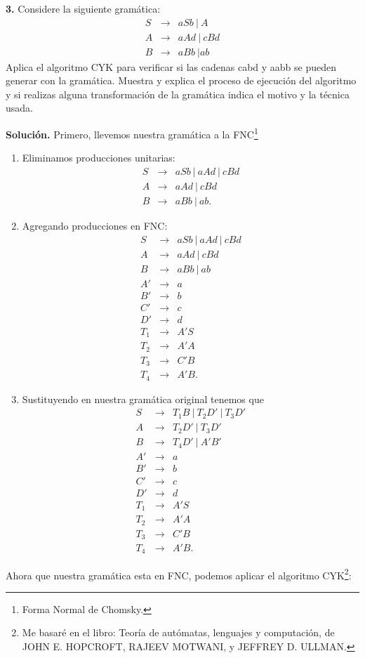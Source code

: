 \textbf{3.} Considere la siguiente gramática:
\begin{eqnarray*}
  S &\rightarrow& aSb\ |\ A\\
  A &\rightarrow& aAd\ |\ cBd\\
  B &\rightarrow& aBb\ | ab
\end{eqnarray*}
Aplica el algoritmo CYK para verificar si las cadenas cabd y aabb se pueden generar con la gramática.
Muestra y explica el proceso de ejecución del algoritmo y si realizas alguna transformación de la gramática
indica el motivo y la técnica usada. \newline

\textbf{Solución.} Primero, llevemos nuestra gramática a la FNC\footnote{Forma Normal de Chomsky.}
\begin{enumerate}
\item Eliminamos producciones unitarias:
\begin{eqnarray*}
S &\rightarrow& aSb\ |\ aAd\ |\ cBd\\
A &\rightarrow& aAd\ |\ cBd\\
B &\rightarrow& aBb\ |\ ab.
\end{eqnarray*}
\item Agregando producciones en FNC:
\begin{eqnarray*}
S &\rightarrow& aSb\ |\ aAd\ |\ cBd\\
A &\rightarrow& aAd\ |\ cBd\\
B &\rightarrow& aBb\ |\ ab\\
A' &\rightarrow& a\\
B' &\rightarrow& b\\
C' &\rightarrow& c\\
D' &\rightarrow& d\\
T_1 &\rightarrow& A'S\\
T_2 &\rightarrow& A'A\\
T_3 &\rightarrow& C'B\\
T_4 &\rightarrow& A'B.
\end{eqnarray*}
\item Sustituyendo en nuestra gramática original tenemos que
\begin{eqnarray*}
S &\rightarrow& T_1B\ |\ T_2D'\ |\ T_3D'\\
A &\rightarrow& T_2D'\ |\ T_3D'\\
B &\rightarrow& T_4D'\ |\ A'B'\\
A' &\rightarrow& a\\
B' &\rightarrow& b\\
C' &\rightarrow& c\\
D' &\rightarrow& d\\
T_1 &\rightarrow& A'S\\
T_2 &\rightarrow& A'A\\
T_3 &\rightarrow& C'B\\
T_4 &\rightarrow& A'B.
\end{eqnarray*}
\end{enumerate}
Ahora que nuestra gramática esta en FNC, podemos aplicar el algoritmo CYK\footnote{Me basaré en el libro: Teoría de autómatas,
lenguajes y computación, de JOHN E. HOPCROFT, RAJEEV MOTWANI, y JEFFREY D. ULLMAN.}:

